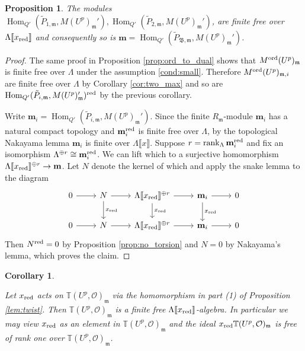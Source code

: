 \documentclass[leqno]{amsart}
\newtheorem{prop}[thm]{Proposition}
\newtheorem{cor}[thm]{Corollary}
\theoremstyle{definition}
\theoremstyle{remark}
\newcommand{\oo}{\mathcal{O}}
\DeclareMathOperator{\Hom}{Hom}
\DeclareMathOperator{\rank}{rank}
\newcommand{\fm}{\mathfrak{m}}
\newcommand{\B}{\mathfrak B} %
\newcommand{\red}{\textnormal{red}}
\newcommand{\xx}{x_\textnormal{red}}
\newcommand{\TT}{\mathbb{T}} %
\newcommand{\ord}{\textnormal{ord}} %
\begin{document}
\begin{prop}\label{prop:Hecke_finite}
The modules
$\Hom_{Q'}(\tilde{P}_{1,\fm},M(U^p)_{\fm}'),
\Hom_{Q'}(\tilde{P}_{2,\fm},M(U^p)_{\fm}')$,
are finite free over 
$\Lambda\llbracket \xx\rrbracket$
and consequently so is 
$\mathbf{m}=
\Hom_{Q'}(\tilde{P}_{\B,\fm},M(U^p)_{\fm}')$.
\end{prop}
\begin{proof}
    The same proof in Proposition \ref{prop:ord_to_dual}
    shows that $M^{\ord}(U^p)_\fm$ is finite free over $\Lambda$
    under the assumption \eqref{cond:small}.
    Therefore $M^{\ord}(U^p)_{\fm,i}$ are finite free over $\Lambda$
    by Corollary \ref{cor:two_max} and so are 
    $\Hom_{Q'}(\tilde{P}_{i,\fm},M(U^p)_{\fm}')^{\red}$
    by the previous corollary.

    Write $\mathbf{m}_i=\Hom_{Q'}(\tilde{P}_{i,\fm},M(U^p)_{\fm}')$.
    Since the finite $R_\fm$-module
    $\mathbf{m}_i$ has a natural compact topology
    and $\mathbf{m}_i^\red$ is finite free over $\Lambda$,
	by the topological Nakayama lemma
	$\mathbf{m}_i$ is finite over $\Lambda\llbracket x\rrbracket$.
    Suppose $r=\rank_{\Lambda}\mathbf{m}_i^\red$
    and fix an isomorphism $\Lambda^{\oplus r}\cong \mathbf{m}_i^\red$.
    We can lift which to a surjective homomorphism
    $\Lambda\llbracket \xx\rrbracket^{\oplus r}\to\mathbf{m}$.
    Let $N$ denote the kernel of which and 
    apply the snake lemma to the diagram
    \[
    \begin{tikzcd}
    0\arrow[r]& 
    N\arrow[r]\arrow[d,"\xx"]&
    \Lambda\llbracket \xx\rrbracket^{\oplus r}\arrow[r]\arrow[d,"\xx"]&
    \mathbf{m}_i\arrow[r]\arrow[d,"\xx"] &0\\
    0\arrow[r]& 
    N\arrow[r]&
    \Lambda\llbracket \xx\rrbracket^{\oplus r}\arrow[r]&
    \mathbf{m}_i\arrow[r] &0
    \end{tikzcd}
    \]
    Then $N^\red=0$ by Proposition \ref{prop:no_torsion}
    and $N=0$ by Nakayama's lemma, which proves the claim.
\end{proof}



\begin{cor}\label{cor:Hecke_ff}

Let $\xx$ acts on $\TT(U^p,\oo)_\fm$ via 
the homomorphism in part (1) of Proposition \ref{lem:twist}.
Then $\TT(U^p,\oo)_\fm$ is a finite free 
$\Lambda\llbracket\xx\rrbracket$-algebra.
In particular we may view $\xx$ as an element in $\TT(U^p,\oo)_\fm$
and the ideal $\xx\TT(U^p,\oo)_\fm$
is free of rank one over $\TT(U^p,\oo)_\fm$.

\end{cor}
\end{document}
